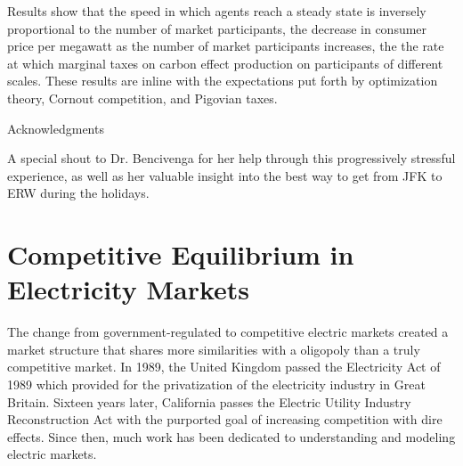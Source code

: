 \documentclass[12pt]{article}
\begin{document}
Results show that the speed in which agents reach a steady state is inversely proportional to the number of market participants, the decrease in consumer price per megawatt as the number of market participants increases, the the rate at which marginal taxes on carbon effect production on participants of different scales. These results are inline with the expectations put forth by optimization theory, Cornout competition, and Pigovian taxes. \*
 
\newpage

\begin{center}Acknowledgments \end{center}
A special shout to Dr. Bencivenga for her help through this progressively stressful experience, as well as her valuable insight into the best way to get from JFK to ERW during the holidays.
\newpage
\tableofcontents
 
\newpage 

\listoffigures

\newpage

\doublespacing
{}
\section{Competitive Equilibrium in Electricity Markets}
The change from government-regulated to competitive electric markets  created a market structure that shares more similarities with a oligopoly than a truly competitive market. In 1989, the United Kingdom passed the Electricity Act of 1989 which provided for the privatization of the electricity industry in Great Britain. Sixteen years later, California passes the Electric Utility Industry Reconstruction Act with the purported goal of increasing competition with dire effects. Since then, much work has been dedicated to understanding and modeling electric markets. \*
\end{document}
